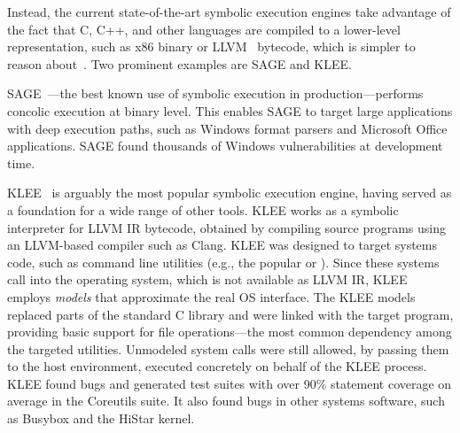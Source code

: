 
Instead, the current state-of-the-art symbolic execution engines take advantage of the fact that C, C++, and other languages are compiled to a lower-level representation, such as x86 binary or LLVM~\cite{llvm} bytecode, which is simpler to reason about~\cite{godefroid:fuzz,klee,bitBlaze,s2eSystem,mayhem}.  Two prominent examples are SAGE and KLEE.

SAGE~\cite{sage2012,godefroid:fuzz}---the best known use of symbolic execution in production---performs concolic execution at binary level.
%
This enables SAGE to target large applications with deep execution paths, such as Windows format parsers and Microsoft Office applications.
%
SAGE found thousands of Windows vulnerabilities at development time.


KLEE~\cite{klee} is arguably the most popular symbolic execution engine, having served as a foundation for a wide range of other tools.
%
KLEE works as a symbolic interpreter for LLVM IR bytecode, obtained by compiling source programs using an LLVM-based compiler such as Clang.
%
KLEE was designed to target systems code, such as command line utilities (e.g., the popular  or ).  Since these systems call into the operating system, which is not available as LLVM IR, KLEE employs \emph{models} that approximate the real OS interface.
%
The KLEE models replaced parts of the standard C library and were linked with the target program, providing basic support for file operations---the most common dependency among the targeted utilities.
%
Unmodeled system calls were still allowed, by passing them to the host environment, executed concretely on behalf of the KLEE process.
%
KLEE found bugs and generated test suites with over 90\% statement coverage on average in the Coreutils suite.  It also found bugs in other systems software, such as Busybox and the HiStar kernel.

